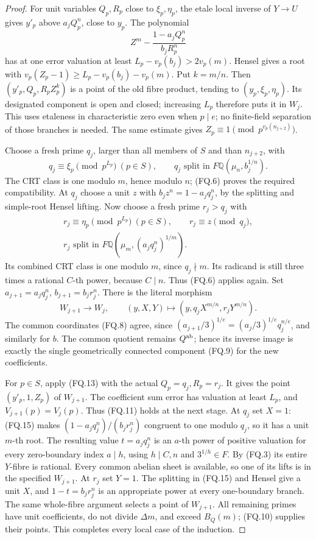 \begin{proof}
For unit variables \(Q_p,R_p\) close to
\(\xi_p,\eta_p\), the etale local inverse of
\(Y\to U\) gives \(y'_p\) above
\(a_jQ_p^n\), close to \(y_p\).
The polynomial
\[
 Z^m-\frac{1-a_jQ_p^n}{b_jR_p^n}
 \tag{FQ.13}
\]
has at one error valuation at least
\(L_p-v_p(b_j)>2v_p(m)\).
Hensel gives a root with
\(v_p(Z_p-1)\ge L_p-v_p(b_j)-v_p(m)\).
Put \(k=m/n\). Then
\((y'_p,Q_p,R_pZ_p^k)\) is a point of the
old fibre product, tending to
\((y_p,\xi_p,\eta_p)\).
Its designated component is open and closed;
increasing \(L_p\) therefore puts it in
\(W_j\). This uses etaleness in characteristic
zero even when \(p\mid e\); no finite-field
separation of those branches is needed.
The same estimate gives
\(Z_p\equiv1\pmod {p^{v_p(n_{j+2})}}\).

Choose a fresh prime \(q_j\), larger than all
members of \(S\) and than \(n_{j+2}\), with
\[
 q_j\equiv\xi_p\pmod {p^{L_p}}\ (p\in S),
 \qquad
 q_j\text{ split in }
 F\mathbb Q(\mu_n,b_j^{1/n}).
 \tag{FQ.14}
\]
The CRT class is one modulo \(m\), hence
modulo \(n\); (FQ.6) proves the required
compatibility. At \(q_j\) choose a unit
\(z\) with \(b_jz^n=1-a_jq_j^n\), by the
splitting and simple-root Hensel lifting.
Now choose a fresh prime \(r_j>q_j\) with
\[
 \begin{gathered}
 r_j\equiv\eta_p\pmod {p^{L_p}}\ (p\in S),
 \qquad r_j\equiv z\pmod {q_j},\\
 r_j\text{ split in }
 F\mathbb Q(\mu_m,(a_jq_j^n)^{1/m}).
 \end{gathered}
 \tag{FQ.15}
\]
Its combined CRT class is one modulo \(m\),
since \(q_j\nmid m\). Its radicand is still
three times a rational \(C\)-th power, because
\(C\mid n\). Thus (FQ.6) applies again.
Set \(a_{j+1}=a_jq_j^n\), \(b_{j+1}=b_jr_j^n\).
There is the literal morphism
\[
 W_{j+1}\longrightarrow W_j,\qquad
 (y,X,Y)\longmapsto
       (y,q_jX^{m/n},r_jY^{m/n}).
 \tag{FQ.16}
\]
The common coordinates (FQ.8) agree, since
\((a_{j+1}/3)^{1/e}=(a_j/3)^{1/e}q_j^{n/e}\),
and similarly for \(b\). The common quotient
remains \(Q^{\rm ab}\); hence its inverse image
is exactly the single geometrically connected
component (FQ.9) for the new coefficients.

For \(p\in S\), apply (FQ.13) with the actual
\(Q_p=q_j,R_p=r_j\). It gives the point
\((y'_p,1,Z_p)\) of \(W_{j+1}\).
The coefficient sum error has valuation at
least \(L_p\), and \(V_{j+1}(p)=V_j(p)\).
Thus (FQ.11) holds at the next stage.
At \(q_j\) set \(X=1\): (FQ.15) makes
\((1-a_jq_j^n)/(b_jr_j^n)\) congruent to one
modulo \(q_j\), so it has a unit \(m\)-th root.
The resulting value \(t=a_jq_j^n\) is an
\(a\)-th power of positive valuation for
every zero-boundary index \(a\mid h\), using
\(h\mid C,n\) and \(3^{1/h}\in F\).
By (FQ.3) its entire \(Y\)-fibre is rational.
Every common abelian sheet is available, so
one of its lifts is in the specified \(W_{j+1}\).
At \(r_j\) set \(Y=1\). The splitting in
(FQ.15) and Hensel give a unit \(X\), and
\(1-t=b_jr_j^n\) is an appropriate power at
every one-boundary branch. The same whole-fibre
argument selects a point of \(W_{j+1}\).
All remaining primes have unit coefficients,
do not divide \(\Delta m\), and exceed
\(B_Q(m)\); (FQ.10) supplies their points.
This completes every local case of the induction.


\end{proof}
